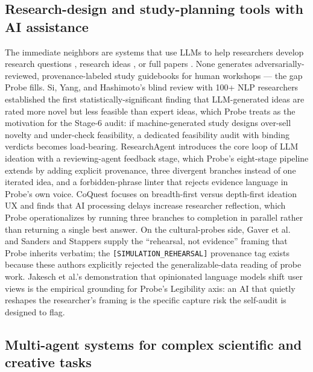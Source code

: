 \subsection{Research-design and study-planning tools with AI assistance}

The immediate neighbors are systems that use LLMs to help researchers develop research questions \citep{liu2024coquest}, research ideas \citep{si2024novelideas, baek2025researchagent}, or full papers \citep{lu2024aiscientist, schmidgall2025agentlab}. None generates adversarially-reviewed, provenance-labeled study guidebooks for human workshops --- the gap Probe fills. Si, Yang, and Hashimoto's blind review with 100+ NLP researchers \citep{si2024novelideas} established the first statistically-significant finding that LLM-generated ideas are rated more novel but less feasible than expert ideas, which Probe treats as the motivation for the Stage-6 audit: if machine-generated study designs over-sell novelty and under-check feasibility, a dedicated feasibility audit with binding verdicts becomes load-bearing. ResearchAgent \citep{baek2025researchagent} introduces the core loop of LLM ideation with a reviewing-agent feedback stage, which Probe's eight-stage pipeline extends by adding explicit provenance, three divergent branches instead of one iterated idea, and a forbidden-phrase linter that rejects evidence language in Probe's own voice. CoQuest \citep{liu2024coquest} focuses on breadth-first versus depth-first ideation UX and finds that AI processing delays increase researcher reflection, which Probe operationalizes by running three branches to completion in parallel rather than returning a single best answer. On the cultural-probes side, Gaver et al.\ \citep{gaver1999probes} and Sanders and Stappers \citep{sanders2014codesign} supply the ``rehearsal, not evidence'' framing that Probe inherits verbatim; the \texttt{[SIMULATION\_REHEARSAL]} provenance tag exists because these authors explicitly rejected the generalizable-data reading of probe work. Jakesch et al.'s demonstration that opinionated language models shift user views \citep{jakesch2023cowriting} is the empirical grounding for Probe's Legibility axis: an AI that quietly reshapes the researcher's framing is the specific capture risk the self-audit is designed to flag.

\subsection{Multi-agent systems for complex scientific and creative tasks}

